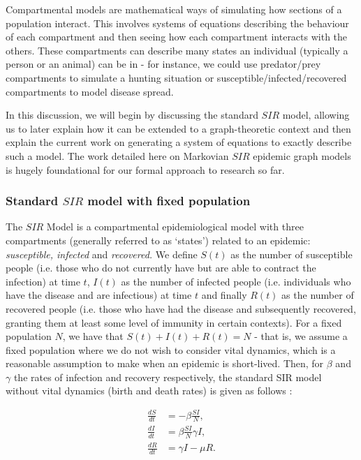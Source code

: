 \documentclass[../report.tex]{subfiles}
\begin{document}
Compartmental models are mathematical ways of simulating how sections of a population interact. This involves systems of equations describing the behaviour of each compartment and then seeing how each compartment interacts with the others. These compartments can describe many states an individual (typically a person or an animal) can be in - for instance, we could use predator/prey compartments to simulate a hunting situation or susceptible/infected/recovered compartments to model disease spread. 

In this discussion, we will begin by discussing the standard $SIR$ model, allowing us to later explain how it can be extended to a graph-theoretic context and then explain the current work on generating a system of equations to exactly describe such a model. The work detailed here on Markovian $SIR$ epidemic graph models is hugely foundational for our formal approach to research so far.

\subsubsection{Standard $SIR$ model with fixed population}

The $SIR$ Model is a compartmental epidemiological model with three compartments (generally referred to as `states') related to an epidemic: {\it susceptible, infected} and {\it recovered.} We define $S(t)$ as the number of susceptible people (i.e. those who do not currently have but are able to contract the infection) at time $t$, $I(t)$ as the number of infected people (i.e. individuals who have the disease and are infectious) at time $t$ and finally $R(t)$ as the number of recovered people (i.e. those who have had the disease and subsequently recovered, granting them at least some level of immunity in certain contexts). For a fixed population $N$, we have that $S(t) + I(t) + R(t) = N$ - that is, we assume a fixed population where we do not wish to consider vital dynamics, which is a reasonable assumption to make when an epidemic is short-lived. Then, for $\beta$ and $\gamma$ the rates of infection and recovery respectively, the standard SIR model without vital dynamics (birth and death rates) is given as follows \cite{hethcote_00}:

\begin{align*}
\frac{dS}{dt} & = -\beta \frac{SI}{N},\\
\frac{dI}{dt} & = \beta\frac{SI}{N} \gamma I,\\
\frac{dR}{dt} & = \gamma I - \mu R.
\end{align*}
\end{document}
